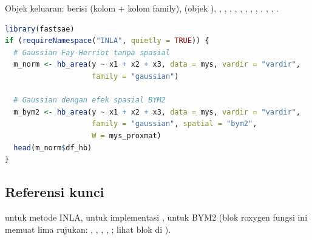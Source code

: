 Objek keluaran:  berisi
 (kolom  + kolom family),  (objek ),
, , ,
, , , ,
, , , ,
.

\begin{lstlisting}[language=R,caption={Contoh yang dapat dijalankan (dari \texttt{man/hb\_area.Rd}).}]
library(fastsae)
if (requireNamespace("INLA", quietly = TRUE)) {
  # Gaussian Fay-Herriot tanpa spasial
  m_norm <- hb_area(y ~ x1 + x2 + x3, data = mys, vardir = "vardir",
                    family = "gaussian")

  # Gaussian dengan efek spasial BYM2
  m_bym2 <- hb_area(y ~ x1 + x2 + x3, data = mys, vardir = "vardir",
                    family = "gaussian", spatial = "bym2",
                    W = mys_proxmat)
  head(m_norm$df_hb)
}
\end{lstlisting}

\subsection{Referensi kunci}\label{sec:hbarea-ref}

\citet{rue2009approximate} untuk metode INLA, \citet{lindgren2015bayesian}
untuk implementasi , \citet{riebler2016intuitive} untuk BYM2
(blok roxygen fungsi ini memuat lima rujukan: \citet{rao2015small},
\citet{riebler2016intuitive}, \citet{marhuenda2013small},
\citet{denicolo2024tipsae}, \citet{rue2009approximate}; lihat blok
 di ).
